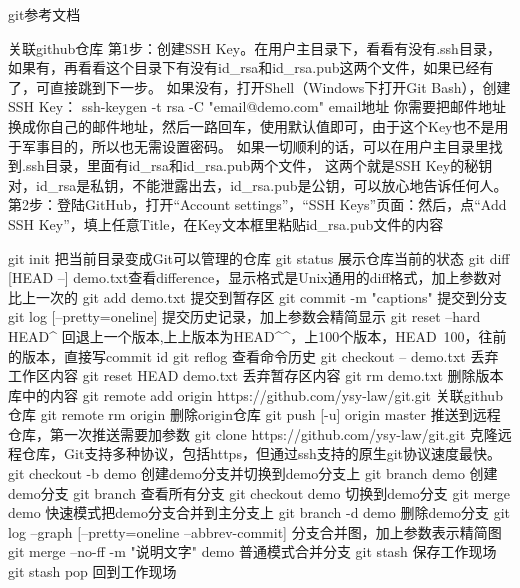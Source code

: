 git参考文档

关联github仓库
第1步：创建SSH Key。在用户主目录下，看看有没有.ssh目录，
       如果有，再看看这个目录下有没有id_rsa和id_rsa.pub这两个文件，如果已经有了，可直接跳到下一步。
       如果没有，打开Shell（Windows下打开Git Bash），创建SSH Key：
       ssh-keygen -t rsa -C "email@demo.com" email地址	 
       你需要把邮件地址换成你自己的邮件地址，然后一路回车，使用默认值即可，由于这个Key也不是用于军事目的，所以也无需设置密码。
       如果一切顺利的话，可以在用户主目录里找到.ssh目录，里面有id_rsa和id_rsa.pub两个文件，
	   这两个就是SSH Key的秘钥对，id_rsa是私钥，不能泄露出去，id_rsa.pub是公钥，可以放心地告诉任何人。	
第2步：登陆GitHub，打开“Account settings”，“SSH Keys”页面：然后，点“Add SSH Key”，填上任意Title，在Key文本框里粘贴id_rsa.pub文件的内容	   

git init                   把当前目录变成Git可以管理的仓库
git status                 展示仓库当前的状态
git diff [HEAD --] demo.txt查看difference，显示格式是Unix通用的diff格式，加上参数对比上一次的
git add  demo.txt          提交到暂存区
git commit -m "captions"   提交到分支
git log [--pretty=oneline] 提交历史记录，加上参数会精简显示
git reset --hard HEAD^     回退上一个版本,上上版本为HEAD^^，上100个版本，HEAD~100，往前的版本，直接写commit id
git reflog                 查看命令历史
git checkout -- demo.txt   丢弃工作区内容
git reset HEAD demo.txt    丢弃暂存区内容 
git rm demo.txt            删除版本库中的内容
git remote add origin https://github.com/ysy-law/git.git  关联github仓库
git remote rm origin                                      删除origin仓库
git push [-u] origin master                               推送到远程仓库，第一次推送需要加参数
git clone https://github.com/ysy-law/git.git              克隆远程仓库，Git支持多种协议，包括https，但通过ssh支持的原生git协议速度最快。
git checkout -b demo       创建demo分支并切换到demo分支上
git branch demo            创建demo分支
git branch                 查看所有分支
git checkout demo          切换到demo分支
git merge demo             快速模式把demo分支合并到主分支上
git branch -d demo         删除demo分支
git log --graph [--pretty=oneline --abbrev-commit] 分支合并图，加上参数表示精简图
git merge --no-ff -m "说明文字" demo  普通模式合并分支
git stash                  保存工作现场
git stash pop              回到工作现场